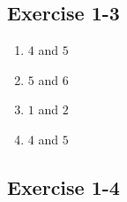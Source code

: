 \subsection{Exercise 1-3} %

\begin{enumerate}[itemsep=5pt, label=\textbf{\arabic*}. ]
\item $4$ and $5$%
\item $5$ and $6$%
\item $1$ and $2$%
\item $4$ and $5$%

\end{enumerate}

\subsection{Exercise 1-4} %

